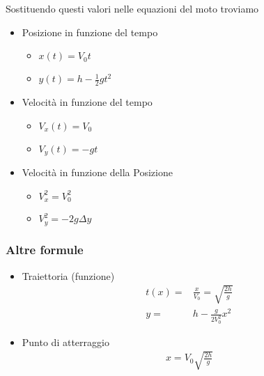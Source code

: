 \documentclass[../main.tex]{subfiles}
\begin{document}
Sostituendo questi valori nelle equazioni del moto troviamo
\begin{itemize}
    \item Posizione in funzione del tempo
    \begin{itemize}
        \item $x(t) = V_{0}t$
        \item $y(t) = h - \frac{1}{2}gt^2$
    \end{itemize}
    \item Velocità in funzione del tempo
    \begin{itemize}
        \item $V_x(t) = V_{0}$
        \item $V_y(t) = - gt$
    \end{itemize}
    \item Velocità in funzione della Posizione
    \begin{itemize}
        \item $V_x^2 = V_{0}^2$
        \item $V_y^2 = - 2g\Delta y$
    \end{itemize}
\end{itemize}

\subsubsection{Altre formule}
\begin{itemize}
    \item Traiettoria (funzione) \begin{align*}
        t(x) =& \frac{x}{V_0} = \sqrt{\frac{2h}{g}}\\
        y =& h - \frac{g}{2V_0^2}x^2
    \end{align*} 
    \item Punto di atterraggio \begin{align*}
        x = V_0 \sqrt{\frac{2h}{g}}
    \end{align*}
\end{itemize}

\vspace{1cm}
\end{document}
